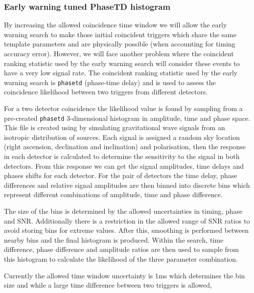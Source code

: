 \subsubsection{\label{6:sec:ew_phasetd}Early warning tuned PhaseTD histogram}

By increasing the allowed coincidence time window we will allow the early warning search to make those initial coincident triggers which share the same template parameters and are physically possible (when accounting for timing accuracy error). However, we will face another problem where the coincident ranking statistic used by the early warning search will consider these events to have a very low signal rate. The coincident ranking statistic used by the early warning search is \verb|phasetd| (phase-time delay) and is used to assess the coincidence likelihood between two triggers from different detectors.

For a two detector coincidence the likelihood value is found by sampling from a pre-created \verb|phasetd| 3-dimensional histogram in amplitude, time and phase space. This file is created using by simulating gravitational wave signals from an isotropic distribution of sources. Each signal is assigned a random sky location (right ascension, declination and inclination) and polarisation, then the response in each detector is calculated to determine the sensitivity to the signal in both detectors. From this response we can get the signal amplitudes, time delays and phases shifts for each detector. For the pair of detectors the time delay, phase differences and relative signal amplitudes are then binned into discrete bins which represent different combinations of amplitude, time and phase difference.

The size of the bins is determined by the allowed uncertainties in timing, phase and SNR. Additionally there is a restriction in the allowed range of SNR ratios to avoid storing bins for extreme values. After this, smoothing is performed between nearby bins and the final histogram is produced. Within the search, time difference, phase difference and amplitude ratios are then used to sample from this histogram to calculate the likelihood of the three parameter combination.

Currently the allowed time window uncertainty is $1$ms which determines the bin size and while a large time difference between two triggers is allowed, 


